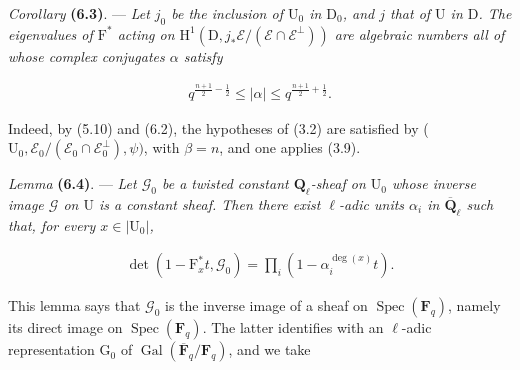 \documentclass[10pt,leqno]{article}
\begin{document}
\noindent \emph{Corollary} \textbf{(6.3)}. — {\itshape Let \(j_{0}\) be the inclusion of \(\mathrm{U}_{0}\) in \(\mathrm{D}_{0}\), and \(j\) that of \(\mathrm{U}\) in \(\mathrm{D}\). The eigenvalues of \(\mathrm{F}^{*}\) acting on \(\mathrm{H}^{1}(\mathrm{D},j_{*}\mathcal{E} /(\mathcal{E} \cap \mathcal{E} ^{\perp }))\) are algebraic numbers all of whose complex conjugates \(\alpha \) satisfy}\par

\begin{equation*}\begin{gathered}q^{\frac{n+1}{2}- \frac{1}{2}} \leq  |\alpha | \leq  q^{\frac{n+1}{2}+\frac{1}{2}}.\end{gathered}\end{equation*}

\noindent Indeed, by (5.10) and (6.2), the hypotheses of (3.2) are satisfied by (\(\mathrm{U}_{0},\mathcal{E} _{0}/(\mathcal{E} _{0}\cap \mathcal{E} _{0}^{\perp }),\psi )\), with \(\beta =n\), and one applies (3.9).\par

\noindent \emph{Lemma} \textbf{(6.4)}. — {\itshape Let \(\mathcal{G} _{0}\) be a twisted constant \(\mathbf{Q}_{\ell }\)-sheaf on \(\mathrm{U}_{0}\) whose inverse image \(\mathcal{G} \) on \(\mathrm{U}\) is a constant sheaf. Then there exist \(\ell \)-adic units \(\alpha _{i}\) in \(\overline{\mathbf{Q}}_{\ell }\) such that, for every \(x\in |\mathrm{U}_{0}|\),}\par

\begin{equation*}\begin{gathered}\operatorname{det}(1- \mathrm{F}_{x}^{*}t,\mathcal{G} _{0})=\prod _{i}(1- \alpha _{i}^{\operatorname{deg}(x)}t).\end{gathered}\end{equation*}

\clearpage

\label{physical-25}\par\smallskip

\noindent This lemma says that \(\mathcal{G} _{0}\) is the inverse image of a sheaf on \(\operatorname{Spec}(\mathbf{F}_{q})\), namely its direct image on \(\operatorname{Spec}(\mathbf{F}_{q})\). The latter identifies with an \(\ell \)-adic representation \(\mathrm{G}_{0}\) of \(\operatorname{Gal}(\overline{\mathbf{F}}_{q}/\mathbf{F}_{q})\), and we take\par
\end{document}

